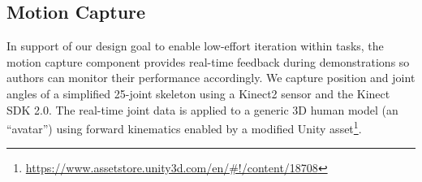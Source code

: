 
\subsection{Motion Capture}

In support of our design goal to enable low-effort iteration within tasks, the motion capture component provides real-time feedback during demonstrations so authors can monitor their performance accordingly.
%
We capture position and joint angles of a simplified 25-joint skeleton using a Kinect2 sensor and the Kinect SDK 2.0. %
%
The real-time joint data is applied to a generic 3D human model (an ``avatar'') using forward kinematics enabled by a modified Unity asset\footnote{\url{https://www.assetstore.unity3d.com/en/\#!/content/18708}}.

